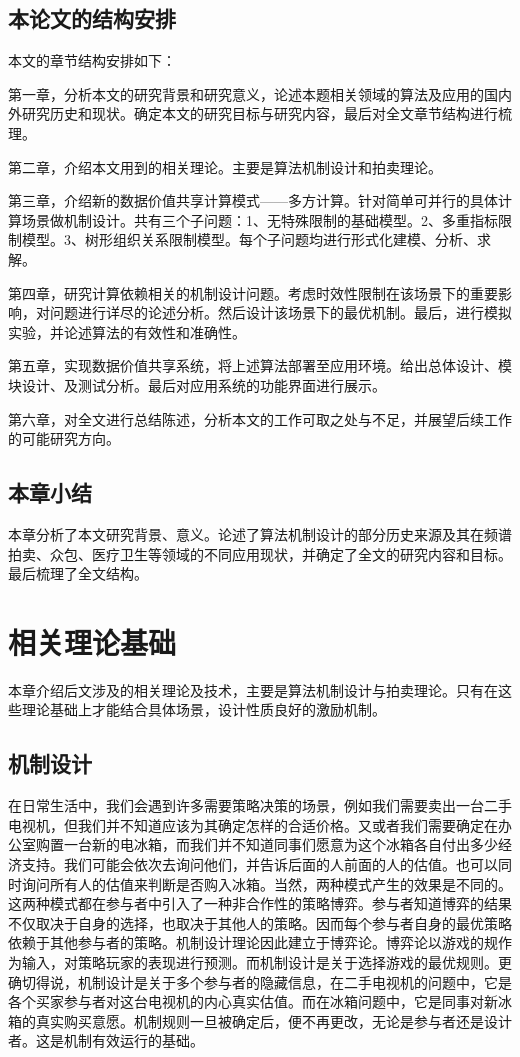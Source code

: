 \documentclass[promaster]{thesis-uestc}
\begin{document}
\section{本论文的结构安排}
本文的章节结构安排如下：

第一章，分析本文的研究背景和研究意义，论述本题相关领域的算法及应用的国内外研究历史和现状。确定本文的研究目标与研究内容，最后对全文章节结构进行梳理。

第二章，介绍本文用到的相关理论。主要是算法机制设计和拍卖理论。

第三章，介绍新的数据价值共享计算模式——多方计算。针对简单可并行的具体计算场景做机制设计。共有三个子问题：1、无特殊限制的基础模型。2、多重指标限制模型。3、树形组织关系限制模型。每个子问题均进行形式化建模、分析、求解。

第四章，研究计算依赖相关的机制设计问题。考虑时效性限制在该场景下的重要影响，对问题进行详尽的论述分析。然后设计该场景下的最优机制。最后，进行模拟实验，并论述算法的有效性和准确性。

第五章，实现数据价值共享系统，将上述算法部署至应用环境。给出总体设计、模块设计、及测试分析。最后对应用系统的功能界面进行展示。

第六章，对全文进行总结陈述，分析本文的工作可取之处与不足，并展望后续工作的可能研究方向。

\section{本章小结}
本章分析了本文研究背景、意义。论述了算法机制设计的部分历史来源及其在频谱拍卖、众包、医疗卫生等领域的不同应用现状，并确定了全文的研究内容和目标。最后梳理了全文结构。


\chapter{相关理论基础}
本章介绍后文涉及的相关理论及技术，主要是算法机制设计与拍卖理论。只有在这些理论基础上才能结合具体场景，设计性质良好的激励机制。

\section{机制设计}
在日常生活中，我们会遇到许多需要策略决策的场景，例如我们需要卖出一台二手电视机，但我们并不知道应该为其确定怎样的合适价格。又或者我们需要确定在办公室购置一台新的电冰箱，而我们并不知道同事们愿意为这个冰箱各自付出多少经济支持。我们可能会依次去询问他们，并告诉后面的人前面的人的估值。也可以同时询问所有人的估值来判断是否购入冰箱。当然，两种模式产生的效果是不同的。这两种模式都在参与者中引入了一种非合作性的策略博弈。参与者知道博弈的结果不仅取决于自身的选择，也取决于其他人的策略。因而每个参与者自身的最优策略依赖于其他参与者的策略。机制设计理论因此建立于博弈论。博弈论以游戏的规作为输入，对策略玩家的表现进行预测。而机制设计是关于选择游戏的最优规则。更确切得说，机制设计是关于多个参与者的隐藏信息，在二手电视机的问题中，它是各个买家参与者对这台电视机的内心真实估值。而在冰箱问题中，它是同事对新冰箱的真实购买意愿。机制规则一旦被确定后，便不再更改，无论是参与者还是设计者。这是机制有效运行的基础。
\end{document}
